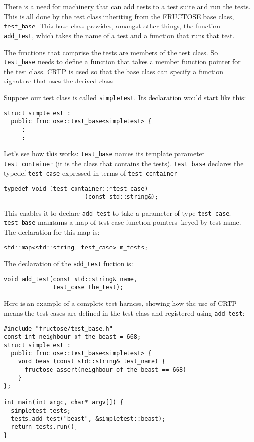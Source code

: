 \documentclass{book}
\begin{document}
There is a need for machinery that can add tests to a test suite and run the
tests. This is all done by the test class inheriting from the FRUCTOSE base
class, {\tt test\_base}. This base class provides, amongst other things, 
the function {\tt add\_test}, which takes the name of a test and a function
that runs that test. 

The functions that comprise the tests are members of the test class.
So {\tt test\_base} needs to define a function that takes a member function 
pointer for the test class.
CRTP is used so that the base class can
specify a function signature that uses the derived class.

Suppose our test class is called {\tt simpletest}.
Its declaration would start like this:
\begin{verbatim}
struct simpletest : 
  public fructose::test_base<simpletest> {
     :
     :
\end{verbatim}
Let's see how this works:
{\tt test\_base} names its template parameter 
{\tt test\_container} (it is the class that contains the tests). 
{\tt test\_base} declares the typedef 
{\tt test\_case} expressed in terms of {\tt test\_container}:
\begin{verbatim}
typedef void (test_container::*test_case)
                       (const std::string&);
\end{verbatim}
This enables it to declare {\tt add\_test} to take a parameter of
type {\tt test\_case}.
{\tt test\_base} maintains a map of test case function pointers, keyed
by test name. The declaration for this map is:
\begin{verbatim}
std::map<std::string, test_case> m_tests;
\end{verbatim}
The declaration of the {\tt add\_test} fuction is:
\begin{verbatim}
void add_test(const std::string& name, 
              test_case the_test);
\end{verbatim}
Here is an example of a complete test harness, showing how the use of
CRTP means the test cases are defined in the test class and
registered using {\tt add\_test}:

\begin{verbatim}
#include "fructose/test_base.h"
const int neighbour_of_the_beast = 668;
struct simpletest : 
  public fructose::test_base<simpletest> {
    void beast(const std::string& test_name) {
      fructose_assert(neighbour_of_the_beast == 668)
    }
};

int main(int argc, char* argv[]) {
  simpletest tests;
  tests.add_test("beast", &simpletest::beast);
  return tests.run();
}
\end{verbatim}
\end{document}
